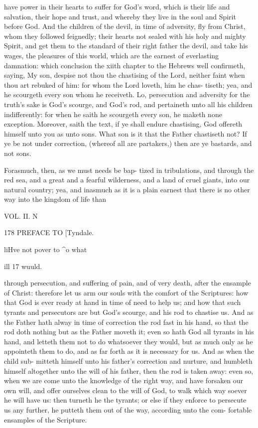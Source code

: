 \documentclass{custom}
\begin{document}
have power in their hearts to suffer for God's 
word, which is their life and salvation, their 
hope and trust, and whereby they live in 
the soul and Spirit before God. And the 
children of the devil, in time of adversity, 
fly from Christ, whom they followed feignedly; 
their hearts not sealed with his holy and mighty 
Spirit, and get them to the standard of their 
right father the devil, and take his wages, the
pleasures of this world, which are the earnest of
everlasting damnation: which conclusion the 
xiith chapter to the Hebrews well confirmeth, 
saying, My son, despise not thou the chastising of 
the Lord, neither faint when thou art rebuked of 
him: for whom the Lord loveth, him he chas-
tiseth; yea, and he scourgeth every son whom
he receiveth. Lo, persecution and adversity for
the truth's sake is God's scourge, and God's rod, 
and pertaineth unto all his children indifferently:
for when he saith he scourgeth every son, he 
maketh none exception. Moreover, saith the 
text, if ye shall endure chastising, God offereth 
himself unto you as unto sons. What son is it 
that the Father chastiseth not? If ye be not 
under correction, (whereof all are partakers,) 
then are ye bastards, and not sons. 

Forasmuch, then, as we must needs be bap- 
tized in tribulations, and through the red sea, 
and a great and a fearful wilderness, and a land 
of cruel giants, into our natural country; yea,
and inasmuch as it is a plain earnest that there
is no other way into the kingdom of life than

VOL. II. N


178 
PREFACE TO 
[Tyndale. 



liHve not 
pover to 
^o what 

ill 17 
wuuld. 



through persecution, and suffering of pain, and 
of very death, after the ensample of Christ:
therefore let us arm our souls with the comfort 
of the Scriptures: how that God is ever ready 
at hand in time of need to help us; and how 
that such tyrants and persecutors are but God's 
scourge, and his rod to chastise us. And as the 
Father hath alway in time of correction the rod 
fast in his hand, so that the rod doth nothing but 
as the Father moveth it; even so hath God all 
tyrants in his hand, and letteth them not to do 
whatsoever they would, but as much only as he 
appointeth them to do, and as far forth as it is 
necessary for us. And as when the child sub- 
mitteth himself unto his father's correction and 
nurture, and humbleth himself altogether unto the 
will of his father, then the rod is taken away:
even so, when we are come unto the knowledge 
of the right way, and have forsaken our own 
will, and offer ourselves clean to the will of 
God, to walk which way soever he will have us:
then turneth he the tyrants; or else if they 
enforce to persecute us any further, he putteth
them out of the way, according unto the com- 
fortable ensamples of the Scripture. 
\end{document}
